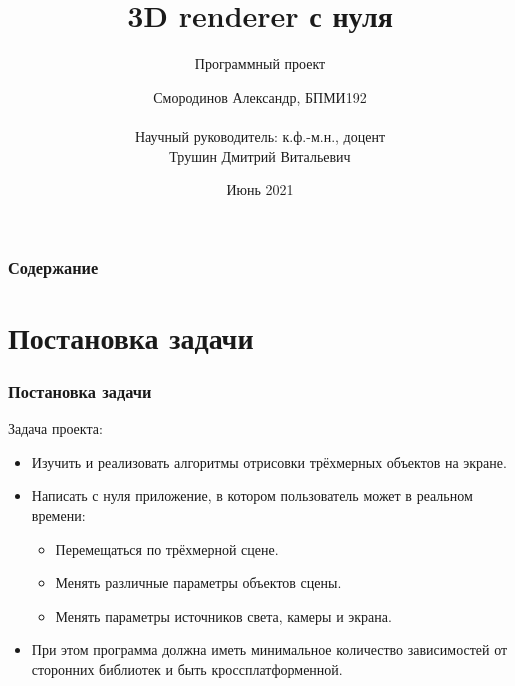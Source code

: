 \documentclass{beamer}
\title[3D renderer с нуля] %
{3D renderer с нуля}
\subtitle{Программный проект}
\author[Смородинов Александр] %
{Смородинов Александр, БПМИ192\\
	\text{}\\
Научный руководитель: к.ф.-м.н., доцент \\
Трушин Дмитрий Витальевич}
\institute[ВШЭ] %
{
	Факультет Компьютерных Наук\\
	НИУ ВШЭ (Москва)
}
\date[Июнь 2021] %
{Июнь 2021}
\begin{document}
	
	\frame{\titlepage}
	
	
	\begin{frame}
		\frametitle{Содержание}
		\tableofcontents
	\end{frame}
	
	
	\section{Постановка задачи}
	
	\begin{frame}
		\frametitle{Постановка задачи}
		
		Задача проекта:
		
		\begin{itemize}
			\item<1-> Изучить и реализовать алгоритмы отрисовки трёхмерных объектов на экране.
			\item<2-> Написать с нуля приложение, в котором пользователь может в реальном времени:
			\begin{itemize}
			\item<3-> Перемещаться по трёхмерной сцене.
			\item<4-> Менять различные параметры объектов сцены.
			\item<5-> Менять параметры источников света, камеры и экрана.
			\end{itemize}
			\item<6-> При этом программа должна иметь минимальное количество зависимостей от сторонних библиотек и быть кроссплатформенной.
		\end{itemize}
	\end{frame}
	
	
\end{document}
